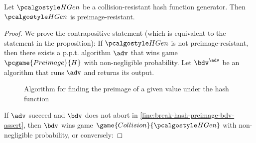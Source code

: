 \begin{proposition}
  Let $\algo{HGen}$ be a collision-resistant hash function generator. Then $\algo{HGen}$ is preimage-resistant.
\end{proposition}
\begin{proof}
  We prove the contrapositive statement (which is equivalent to the statement in the proposition):
  If $\algo{HGen}$ is not preimage-resistant, then there exists a p.p.t. algorithm $\adv$ that wins game $\pcgame{Preimage}{H}$ with non-negligible probability.
  Let $\bdv^\adv$ be an algorithm that runs $\adv$ and returns its output.
  \begin{figure}[tbhp]
  \begin{center}
    \begin{tcolorbox}[width=4cm]
      \begin{pchstack}[center]
      \end{pchstack}
    \end{tcolorbox}
  \end{center}
  \caption{Algorithm for finding the preimage of a given value under the hash function \label{fig:break-hash-preimage-bdv}}
  \end{figure}
  If $\adv$ succeed and $\bdv$ does not abort in \cref{line:break-hash-preimage-bdv-assert}, then $\bdv$ wins game $\game{Collision}{\algo{HGen}}$ with non-negligible probability, or conversely:


\end{proof}
